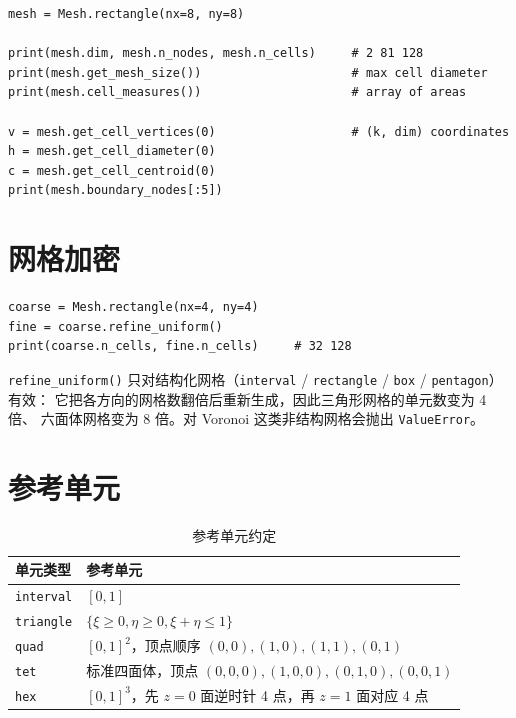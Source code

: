 \documentclass[UTF8,11pt,oneside]{ctexbook}
\theoremstyle{definition}
\theoremstyle{plain}
\newcommand{\code}[1]{\texttt{#1}}
\begin{document}
\begin{lstlisting}[language=MosicaFE,caption={示例 4.2：读取网格信息}]
mesh = Mesh.rectangle(nx=8, ny=8)

print(mesh.dim, mesh.n_nodes, mesh.n_cells)     # 2 81 128
print(mesh.get_mesh_size())                     # max cell diameter
print(mesh.cell_measures())                     # array of areas

v = mesh.get_cell_vertices(0)                   # (k, dim) coordinates
h = mesh.get_cell_diameter(0)
c = mesh.get_cell_centroid(0)
print(mesh.boundary_nodes[:5])
\end{lstlisting}

\section{网格加密}

\begin{lstlisting}[language=MosicaFE,caption={示例 4.3：均匀加密}]
coarse = Mesh.rectangle(nx=4, ny=4)
fine = coarse.refine_uniform()
print(coarse.n_cells, fine.n_cells)     # 32 128
\end{lstlisting}

\code{refine\_\allowbreak uniform()} 只对结构化网格（\code{interval} /
\code{rectangle} / \code{box} / \code{pentagon}）有效：
它把各方向的网格数翻倍后重新生成，因此三角形网格的单元数变为 4 倍、
六面体网格变为 8 倍。对 Voronoi 这类非结构网格会抛出 \code{ValueError}。

\section{参考单元}

\begin{table}[htbp]
\centering
\caption{参考单元约定}
\label{tab:refelem}
\begin{lrbox}{\guideTableBox}
\begin{tabular}{@{}ll@{}}
\toprule
单元类型 & 参考单元 \\
\midrule
\code{interval} & $[0,1]$ \\
\code{triangle} & $\{\xi\ge0,\eta\ge0,\xi+\eta\le1\}$ \\
\code{quad} & $[0,1]^2$，顶点顺序 $(0,0),(1,0),(1,1),(0,1)$ \\
\code{tet} & 标准四面体，顶点 $(0,0,0),(1,0,0),(0,1,0),(0,0,1)$ \\
\code{hex} & $[0,1]^3$，先 $z=0$ 面逆时针 4 点，再 $z=1$ 面对应 4 点 \\
\bottomrule
\end{tabular}
\end{lrbox}%
\ifdim\wd\guideTableBox>\linewidth
  \resizebox{\linewidth}{!}{\usebox{\guideTableBox}}%
\else\usebox{\guideTableBox}\fi
\end{table}
\end{document}
